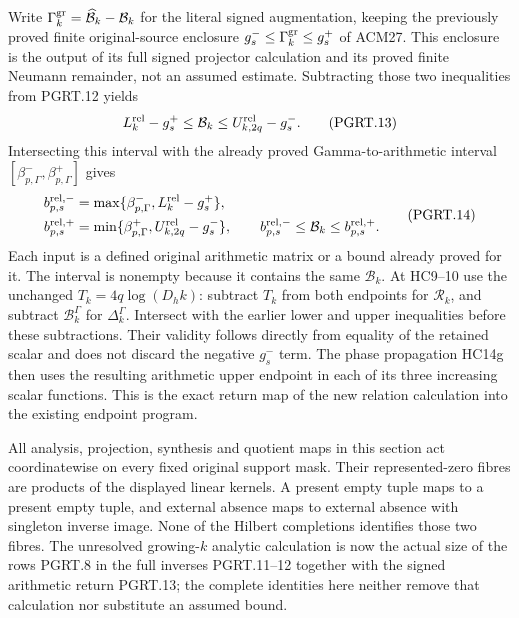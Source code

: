 Write $\Gamma_k^{\rm gr}=\widehat{\mathcal B}_k-\mathcal B_k$
for the literal signed augmentation, keeping the previously proved
finite original-source enclosure $g_s^-\leq\Gamma_k^{\rm gr}\leq g_s^+$
of ACM27. This enclosure is the output of its full signed projector
calculation and its proved finite Neumann remainder, not an assumed
estimate. Subtracting those two inequalities from PGRT.12 yields
\[
 L_k^{\rm rel}-g_s^+\leq\mathcal B_k
                  \leq U_{k,2q}^{\rm rel}-g_s^-.
\tag{PGRT.13}\label{eq:pgrt-arithmetic-return}
\]
Intersecting this interval with the already proved Gamma-to-arithmetic
interval $[\beta_{p,\Gamma}^-,\beta_{p,\Gamma}^+]$ gives
\[
\begin{aligned}
 b_{p,s}^{\rm rel,-}
 &=\max\{\beta_{p,\Gamma}^-,L_k^{\rm rel}-g_s^+\},\\
 b_{p,s}^{\rm rel,+}
 &=\min\{\beta_{p,\Gamma}^+,U_{k,2q}^{\rm rel}-g_s^-\},\qquad
 b_{p,s}^{\rm rel,-}\leq\mathcal B_k\leq b_{p,s}^{\rm rel,+}.
\end{aligned}
\tag{PGRT.14}\label{eq:pgrt-current-interval}
\]
Each input is a defined original arithmetic matrix or a bound already
proved for it. The interval is nonempty because it contains the same
$\mathcal B_k$. At HC9--10 use the unchanged $T_k=4q\log(D_hk)$:
subtract $T_k$ from both endpoints for $\mathcal R_k$, and subtract
$\mathcal B_k^\Gamma$ for $\Delta_k^\Gamma$. Intersect with the
earlier lower and upper inequalities before these subtractions.
Their validity follows directly from equality of the retained scalar
and does not discard the negative $g_s^-$ term. The phase propagation
HC14g then uses the resulting arithmetic upper endpoint in each of
its three increasing scalar functions. This is the exact return map
of the new relation calculation into the existing endpoint program.

All analysis, projection, synthesis and quotient maps in this section
act coordinatewise on every fixed original support mask. Their
represented-zero fibres are products of the displayed linear kernels.
A present empty tuple maps to a present empty tuple, and external
absence maps to external absence with singleton inverse image.
None of the Hilbert completions identifies those two fibres.
The unresolved growing-$k$ analytic calculation is now the actual
size of the rows PGRT.8 in the full inverses PGRT.11--12 together
with the signed arithmetic return PGRT.13; the complete identities
here neither remove that calculation nor substitute an assumed bound.
